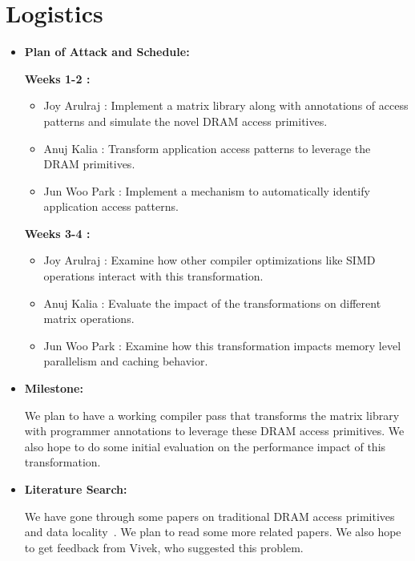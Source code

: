 \documentclass[letterpaper]{article}
\begin{document}
\section{Logistics}

\begin{itemize}

\item \textbf{Plan of Attack and Schedule:}

\textbf{Weeks 1-2 :}

\begin{itemize}
\item Joy Arulraj : Implement a matrix library along with annotations of access
patterns and simulate the novel DRAM access primitives.

\item Anuj Kalia : Transform application access patterns to leverage the DRAM
primitives.

\item Jun Woo Park : Implement a mechanism to automatically identify application
access patterns.
\end{itemize}

\textbf{Weeks 3-4 :}

\begin{itemize}
\item Joy Arulraj : Examine how other compiler optimizations like SIMD
operations interact with this transformation.

\item Anuj Kalia : Evaluate the impact of the transformations on different
matrix operations.

\item Jun Woo Park : Examine how this transformation impacts memory level
parallelism and caching behavior.
\end{itemize}


\item \textbf{Milestone:} 

We plan to have a working compiler pass that transforms the matrix library 
with programmer annotations to leverage these DRAM access primitives.
We also hope to do some initial evaluation on the performance impact
of this transformation.

\item \textbf{Literature Search:}  

We have gone through some papers on traditional DRAM access primitives and data
locality~\cite{dram1,dram2}. We plan to read some more related papers.
We also hope to get feedback from Vivek, who suggested this problem.


\end{itemize}
\end{document}
